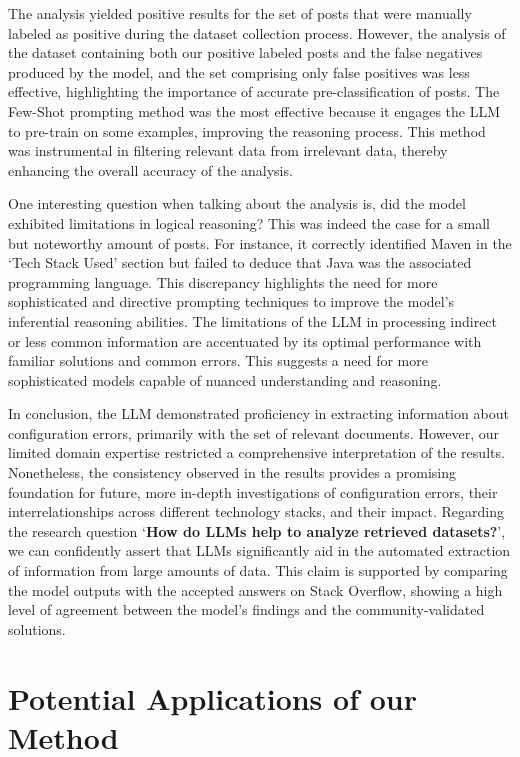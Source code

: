 \documentclass[english,bachelor]{swsLeipzig}
\begin{document}
The analysis yielded positive results for the set of posts that were manually labeled as positive during the dataset collection process. However, the analysis of the dataset containing both our positive labeled posts and the false negatives produced by the model, and the set comprising only false positives was less effective, highlighting the importance of accurate pre-classification of posts. The Few-Shot prompting method was the most effective because it engages the LLM to pre-train on some examples, improving the reasoning process. This method was instrumental in filtering relevant data from irrelevant data, thereby enhancing the overall accuracy of the analysis.

One interesting question when talking about the analysis is, did the model exhibited limitations in logical reasoning? This was indeed the case for a small but noteworthy amount of posts. For instance, it correctly identified Maven in 
the `Tech Stack Used' section but failed to deduce that Java was the associated programming language. This discrepancy highlights the need for more sophisticated and directive prompting techniques to improve the model's inferential reasoning abilities. The limitations of the LLM in processing indirect or less common information are accentuated by its optimal performance with familiar solutions and common errors. This suggests a need for more sophisticated models capable of nuanced understanding and reasoning.

In conclusion, the LLM demonstrated proficiency in extracting information about configuration errors, 
primarily with the set of relevant documents. However, our limited domain expertise restricted a comprehensive interpretation of the results. Nonetheless, the consistency observed in the results provides a promising foundation for future, more in-depth investigations of configuration errors, their interrelationships across different technology stacks, and their impact. Regarding the research question `\textbf{How do LLMs help to analyze retrieved datasets?}', we can confidently assert that LLMs significantly aid in the automated extraction of information from large amounts of data. This claim is supported by comparing the model outputs with the accepted answers on Stack Overflow, showing a high level of agreement between the model's findings and the community-validated solutions.

\section{Potential Applications of our Method}
\end{document}
